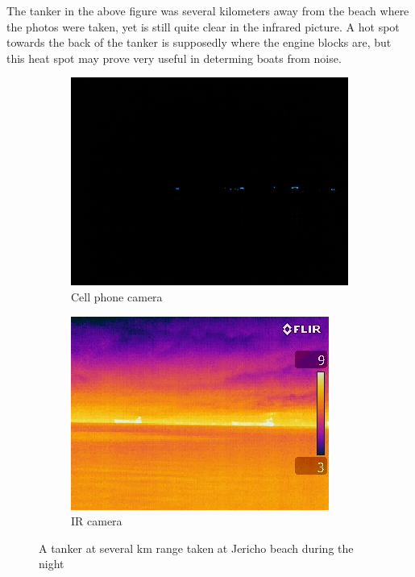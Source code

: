 The tanker in the above figure was several kilometers away from the beach where the photos were taken, yet is still quite clear in the infrared picture. A hot spot towards the back of the tanker is supposedly where the engine blocks are, but this heat spot may prove very useful in determing boats from noise.

\begin{figure}
\centering
\begin{subfigure}{.5\textwidth}
  \centering
  \includegraphics[width=.8\linewidth]{"./image/jericho-night-tankers-visible"}
  \caption{Cell phone camera}
  \label{fig:sub1}
\end{subfigure}%
\begin{subfigure}{.5\textwidth}
  \centering
  \includegraphics[width=.8\linewidth]{"./image/jericho-night-tankers-ir"}
  \caption{IR camera}
  \label{fig:sub2}
\end{subfigure}
\caption{A tanker at several km range taken at Jericho beach during the night}
\label{fig:IR comparison of a tankerat night}
\end{figure}

